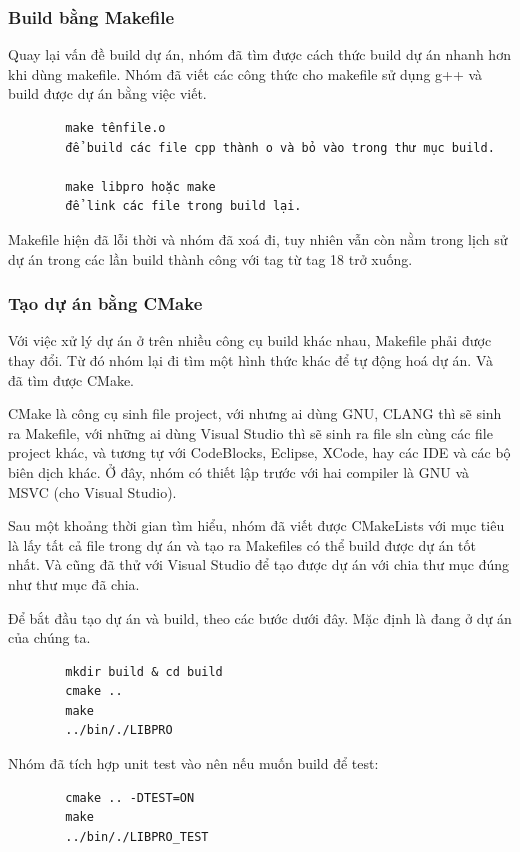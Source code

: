 \documentclass[12pt,a4paper]{report}
\begin{document}
		\subsubsection{Build bằng Makefile}

		Quay lại vấn đề build dự án, nhóm đã tìm được cách thức build dự án nhanh hơn khi dùng makefile. Nhóm đã viết các công thức cho makefile sử dụng g++ và build được dự án bằng việc viết.
		\begin{verbatim}
		make tênfile.o
		để build các file cpp thành o và bỏ vào trong thư mục build.

		make libpro hoặc make
		để link các file trong build lại.
		\end{verbatim}
		Makefile hiện đã lỗi thời và nhóm đã xoá đi, tuy nhiên vẫn còn nằm trong lịch sử dự án trong các lần build thành công với tag từ tag 18 trở xuống.

		\subsubsection{Tạo dự án bằng CMake}
		Với việc xử lý dự án ở trên nhiều công cụ build khác nhau, Makefile phải được thay đổi. Từ đó nhóm lại đi tìm một hình thức khác để tự động hoá dự án. Và đã tìm được CMake.\par
		CMake là công cụ sinh file project, với nhưng ai dùng GNU, CLANG thì sẽ sinh ra Makefile, với những ai dùng Visual Studio thì sẽ sinh ra file sln cùng các file project khác, và tương tự với CodeBlocks, Eclipse, XCode, hay các IDE và các bộ biên dịch khác. Ở đây, nhóm có thiết lập trước với hai compiler là GNU và MSVC (cho Visual Studio).\par
		Sau một khoảng thời gian tìm hiểu, nhóm đã viết được CMakeLists với mục tiêu là lấy tất cả file trong dự án và tạo ra Makefiles có thể build được dự án tốt nhất. Và cũng đã thử với Visual Studio để tạo được dự án với chia thư mục đúng như thư mục đã chia.\par

		Để bắt đầu tạo dự án và build, theo các bước dưới đây. Mặc định là đang ở dự án của chúng ta.
		\begin{verbatim}
		mkdir build & cd build
		cmake ..
		make
		../bin/./LIBPRO
		\end{verbatim}
		Nhóm đã tích hợp unit test vào nên nếu muốn build để test:
		\begin{verbatim}
		cmake .. -DTEST=ON
		make
		../bin/./LIBPRO_TEST
		\end{verbatim}
\end{document}
